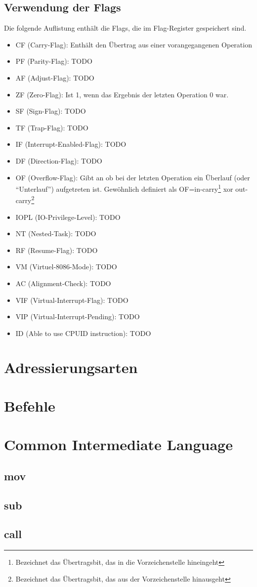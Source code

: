 \subsection{Verwendung der Flags}
Die folgende Auflistung enthält die Flags, die im Flag-Register gespeichert sind.
\begin{itemize}
\item CF (Carry-Flag): Enthält den Übertrag aus einer vorangegangenen Operation
\item PF (Parity-Flag): TODO
\item AF (Adjust-Flag): TODO
\item ZF (Zero-Flag): Ist 1, wenn das Ergebnis der letzten Operation 0 war.
\item SF (Sign-Flag): TODO
\item TF (Trap-Flag): TODO
\item IF (Interrupt-Enabled-Flag): TODO
\item DF (Direction-Flag): TODO
\item OF (Overflow-Flag): Gibt an ob bei der letzten Operation ein Überlauf (oder \enquote{Unterlauf}) aufgetreten ist. Gewöhnlich definiert als OF=in-carry\footnote{Bezeichnet das Übertragsbit, das in die Vorzeichenstelle hineingeht} xor out-carry\footnote{Bezeichnet das Übertragsbit, das aus der Vorzeichenstelle hinausgeht}
\item IOPL (IO-Privilege-Level): TODO
\item NT (Nested-Task): TODO
\item RF (Resume-Flag): TODO
\item VM (Virtuel-8086-Mode): TODO
\item AC (Alignment-Check): TODO
\item VIF (Virtual-Interrupt-Flag): TODO
\item VIP (Virtual-Interrupt-Pending): TODO
\item ID (Able to use CPUID instruction): TODO
\end{itemize}
\section{Adressierungsarten}
\section{Befehle}
\section{Common Intermediate Language}
\subsection{mov}
\subsection{sub}
\subsection{call}
\clearpage

